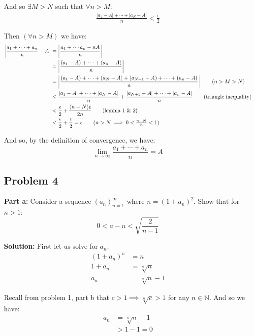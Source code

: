 \documentclass{article}
\newcommand{\N}{\mathbb N}
\begin{document}
And so $\exists M>N$ such that $\forall n>M$:
\begin{align*}
  \frac{|a_1-A|+\cdots+|a_N-A|}{n}<\frac{\epsilon}{2}\tag{lemma 2}
\end{align*}

Then $(\forall n>M)$ we have:
\begin{align*}
  \left|\frac{a_1+\cdots+a_n}{n}-A\right|&=\left|\frac{a_1+\cdots a_n-nA}{n}\right|\\
  &=\left|\frac{(a_1-A)+\cdots+(a_n-A)}{n}\right|\\
  &=\left|\frac{(a_1-A)+\cdots+(a_N-A)+(a_{N+1}-A)+\cdots+(a_n-A)}{n}\right|\tag{$n>M>N$}\\
  &\le\frac{|a_1-A|+\cdots+|a_N-A|}{n}+\frac{|a_{N+1}-A|+\cdots+|a_n-A|}{n}\tag{triangle inequality}\\
  &<\frac{\epsilon}{2}+\frac{(n-N)\epsilon}{2n}\tag{lemma 1 \& 2}\\
  &<\frac{\epsilon}{2}+\frac{\epsilon}{2}=\epsilon\tag{$n>N\implies 0<\frac{n-N}{n}<1$}
\end{align*}

And so, by the definition of convergence, we have:
\begin{equation*}
  \lim_{n\to\infty}\frac{a_1+\cdots+a_n}{n}=A
\end{equation*}
\bigskip



\subsection*{Problem 4}
\noindent\textbf{Part a:} Consider a sequence $(a_n)_{n=1}^\infty$ where $n=(1+a_n)^2$. Show that for $n>1$:
$$0<a-n<\sqrt{\frac{2}{n-1}}$$

\noindent\textbf{Solution:} First let us solve for $a_n$:
\begin{align*}
  (1+a_n)^n&=n\\
  1+a_n&=\sqrt[n]{n}\\
  a_n&=\sqrt[n]{n}-1
\end{align*}

Recall from problem 1, part b that $c>1\implies \sqrt[n]{c}>1$ for any $n\in\N$. And so we have:
\begin{align*}
  a_n&=\sqrt[n]{n}-1\tag{def. of $a_n$}\\
  &>1-1=0
\end{align*}
\end{document}
